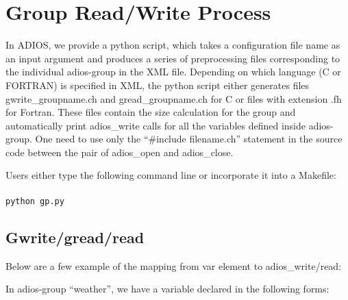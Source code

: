 \chapter{Group Read/Write Process}

In ADIOS, we provide a python script, which takes a configuration file name as 
an input argument and produces a series of preprocessing files corresponding to 
the individual adios-group in the XML file. Depending on which language (C or FORTRAN) 
is specified in XML, the python script either generates files gwrite\_groupname.ch 
and gread\_groupname.ch for C or files with extension .fh for Fortran. These files 
contain the size calculation for the group and automatically print adios\_write 
calls for all the variables defined inside adios-group. One need to use only the 
``\#include filename.ch'' statement in the source code between the pair of adios\_open 
and adios\_close.

Users either type the following command line or incorporate it into a Makefile:
\\
\\
\verb+python gp.py+

\section{Gwrite/gread/read}

Below are a few example of the mapping from var element to adios\_write/read:

In adios-group ``weather'', we have a variable declared in the following forms:

